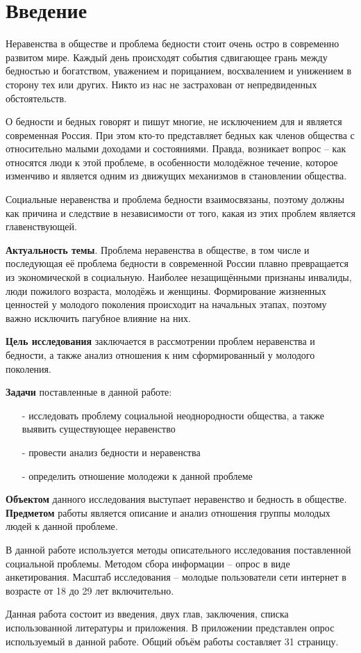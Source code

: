 \section*{Введение}

Неравенства в обществе и проблема бедности стоит очень остро в современно 
развитом мире. Каждый день происходят события сдвигающее грань между бедностью 
и богатством, уважением и порицанием, восхвалением и унижением в сторону тех 
или других. Никто из нас не застрахован от непредвиденных обстоятельств.

О бедности и бедных говорят и пишут многие, не исключением для и является 
современная Россия. При этом кто-то представляет бедных как членов общества с 
относительно малыми доходами и состояниями. Правда, возникает вопрос -- 
как относятся люди к этой проблеме, в особенности молодёжное течение, которое 
изменчиво и является одним из движущих механизмов в становлении общества.

Социальные неравенства и проблема бедности взаимосвязаны, поэтому должны как 
причина и следствие в независимости от того, какая из этих проблем является 
главенствующей.

\textbf{Актуальность темы}. Проблема неравенства в обществе, в том числе и 
последующая её проблема бедности в современной России плавно превращается из 
экономической в социальную. Наиболее незащищёнными признаны инвалиды, люди 
пожилого возраста, молодёжь и женщины. Формирование жизненных ценностей у 
молодого поколения происходит на начальных этапах, поэтому важно исключить 
пагубное влияние на них.

\textbf{Цель исследования} заключается в рассмотрении проблем неравенства и 
бедности, а также анализ отношения к ним сформированный у молодого поколения.  

\textbf{Задачи} поставленные в данной работе:
\begin{itemize}
    \item[-] исследовать проблему социальной неоднородности общества, а также 
        выявить существующее неравенство
    \item[-] провести анализ бедности и неравенства
    \item[-] определить отношение молодежи к данной проблеме
\end{itemize}

\textbf{Объектом} данного исследования выступает неравенство и бедность в 
обществе. \textbf{Предметом} работы является описание и анализ отношения 
группы молодых людей к данной проблеме.

В данной работе используется методы описательного исследования поставленной 
социальной проблемы. Методом сбора информации -- опрос в виде анкетирования.
Масштаб исследования -- молодые пользователи сети интернет в возрасте от 18 до
29 лет включительно.

Данная работа состоит из введения, двух глав, заключения, списка использованной 
литературы и приложения. В приложении представлен опрос используемый в данной 
работе. Общий объём работы составляет 31 страницу.

\newpage